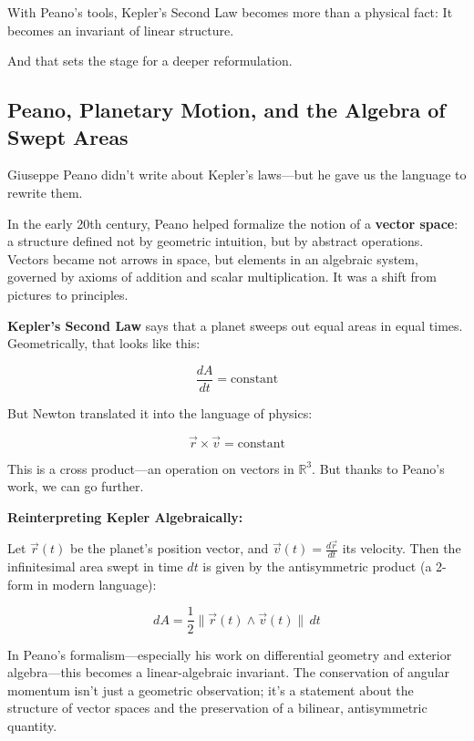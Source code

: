 With Peano’s tools, Kepler’s Second Law becomes more than a physical fact:  
It becomes an invariant of linear structure.

And that sets the stage for a deeper reformulation.


\subsection{Peano, Planetary Motion, and the Algebra of Swept Areas}

Giuseppe Peano didn’t write about Kepler’s laws—but he gave us the language to rewrite them.

In the early 20th century, Peano helped formalize the notion of a \textbf{vector space}: a structure defined not by geometric intuition, but by abstract operations. Vectors became not arrows in space, but elements in an algebraic system, governed by axioms of addition and scalar multiplication. It was a shift from pictures to principles.

\bigskip

\textbf{Kepler’s Second Law} says that a planet sweeps out equal areas in equal times. Geometrically, that looks like this:

\[
\frac{dA}{dt} = \text{constant}
\]

But Newton translated it into the language of physics:

\[
\vec{r} \times \vec{v} = \text{constant}
\]

This is a cross product—an operation on vectors in \( \mathbb{R}^3 \). But thanks to Peano’s work, we can go further.

\bigskip

\textbf{Reinterpreting Kepler Algebraically:}

Let \( \vec{r}(t) \) be the planet’s position vector, and \( \vec{v}(t) = \frac{d\vec{r}}{dt} \) its velocity. Then the infinitesimal area swept in time \( dt \) is given by the antisymmetric product (a 2-form in modern language):

\[
dA = \frac{1}{2} \| \vec{r}(t) \wedge \vec{v}(t) \| \, dt
\]

In Peano’s formalism—especially his work on differential geometry and exterior algebra—this becomes a linear-algebraic invariant. The conservation of angular momentum isn’t just a geometric observation; it’s a statement about the structure of vector spaces and the preservation of a bilinear, antisymmetric quantity.

\bigskip

